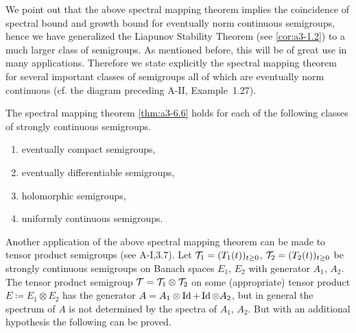 We point out that the above spectral mapping theorem implies the coincidence of spectral bound and growth bound for eventually norm continuous semigroups, hence we have generalized the Liapunov Stability Theorem (see \ref{cor:a3-1.2}) to a much larger class of semigroups.
As mentioned before, this will be of great use in many applications.
Therefore we state explicitly the spectral mapping theorem for several important classes of semigroups all of which are eventually norm continuous (cf. the diagram preceding A-II, Example~1.27).
\begin{corollary}\label{cor:a3-6.7}
The spectral mapping theorem \ref{thm:a3-6.6}
holds for each of the following classes of strongly continuous semigroups.
\begin{enumerate}[\upshape (i)]
\item 
eventually compact semigroups,

\item 
eventually differentiable semigroups,

\item 
holomorphic semigroups,

\item 
uniformly continuous semigroups.
\end{enumerate}
\end{corollary}
Another application of the above spectral mapping theorem can be made to tensor product semigroups (see A-I,3.7).
Let $\mathcal{T}_{1} = (T_{1}(t))_{t\geq 0}$, $\mathcal{T}_{2} = (T_{2}(t))_{t\geq 0}$ be strongly continuous semigroups on Banach spaces $E_{1}$, $E_{2}$ with generator $A_{1}$, $A_{2}$.
The tensor product semigroup $\mathcal{T} = \mathcal{T}_{1} \otimes \mathcal{T}_{2}$ on some (appropriate) tensor product $E \coloneqq E_{1} \otimes E_{2}$ has the generator $A = A_{1}\otimes\operatorname{Id} + \operatorname{Id}\otimes A_{2}$, but in general the spectrum of $A$ is not determined by the spectra of $A_{1}$, $A_{2}$.
But with an additional hypothesis the following can be proved.

\phantom{x}

